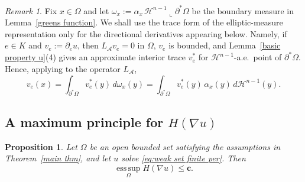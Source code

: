 \documentclass[reqno,11pt]{amsart}
\makeatletter
\newtheorem{prop}[thm]{Proposition}%
\numberwithin{equation}{section}
\theoremstyle{remark}
\newtheorem{rem}[thm]{Remark}%
\makeatother
\begin{document}
\begin{rem}\label{rem:repr}
{Fix $x\in\Omega$ and let $\omega_x:=\alpha_x\,\mathscr H^{n-1}\llcorner\partial^*\Omega$ be the boundary
measure in Lemma~\ref{greens function}. We shall use the trace form of the elliptic-measure representation only for
the directional derivatives appearing below. Namely, if $e\in K$ and $v_e:=\partial_e u$, then
$L_{\mathcal A}v_e=0$ in $\Omega$, $v_e$ is bounded, and Lemma~\ref{basic property u}(4) gives an approximate interior
trace $v_e^*$ for $\mathscr H^{n-1}$-a.e.\ point of $\partial^*\Omega$. Hence, applying \cite[Lemma~3.3]{FZ2025}
to the operator $L_{\mathcal A}$,}
\[
{
v_e(x)=\int_{\partial^*\Omega} v_e^*(y)\,d\omega_x(y)
=\int_{\partial^*\Omega} v_e^*(y)\,\alpha_x(y)\,d\mathscr H^{n-1}(y).
}
\]
\end{rem}




\subsection{A maximum principle for $H(\nabla u)$}

\begin{prop}\label{max nabla u}
Let $\Omega$ be an open bounded set satisfying the assumptions in Theorem~\ref{main thm}, and let $u$ solve
\eqref{eq:weak set finite per}. Then
\[
{\operatorname*{ess\,sup}_{\Omega} H(\nabla u)\le \mathbf{c}.}
\]
\end{prop}
\end{document}
